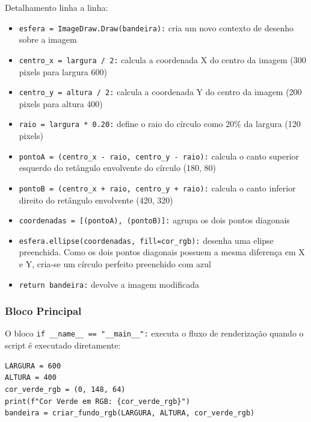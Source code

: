 \documentclass{article}
\begin{document}
Detalhamento linha a linha:

\begin{itemize}
    \item \texttt{esfera = ImageDraw.Draw(bandeira):} cria um novo contexto de desenho sobre a imagem

    \item \texttt{centro\_x = largura / 2:} calcula a coordenada X do centro da imagem (300 pixels para largura 600)

    \item \texttt{centro\_y = altura / 2:} calcula a coordenada Y do centro da imagem (200 pixels para altura 400)

    \item \texttt{raio = largura * 0.20:} define o raio do círculo como 20\% da largura (120 pixels)

    \item \texttt{pontoA = (centro\_x - raio, centro\_y - raio):} calcula o canto superior esquerdo do retângulo envolvente do círculo (180, 80)

    \item \texttt{pontoB = (centro\_x + raio, centro\_y + raio):} calcula o canto inferior direito do retângulo envolvente (420, 320)

    \item \texttt{coordenadas = [(pontoA), (pontoB)]:} agrupa os dois pontos diagonais

    \item \texttt{esfera.ellipse(coordenadas, fill=cor\_rgb):} desenha uma elipse preenchida. Como os dois pontos diagonais possuem a mesma diferença em X e Y, cria-se um círculo perfeito preenchido com azul

    \item \texttt{return bandeira:} devolve a imagem modificada
\end{itemize}

\subsubsection{Bloco Principal}

O bloco \texttt{if \_\_name\_\_ == "\_\_main\_\_":} executa o fluxo de renderização quando o script é executado diretamente:

\begin{lstlisting}[style=pythonstyle]
LARGURA = 600
ALTURA = 400
cor_verde_rgb = (0, 148, 64)
print(f"Cor Verde em RGB: {cor_verde_rgb}")
bandeira = criar_fundo_rgb(LARGURA, ALTURA, cor_verde_rgb)
\end{lstlisting}
\end{document}
